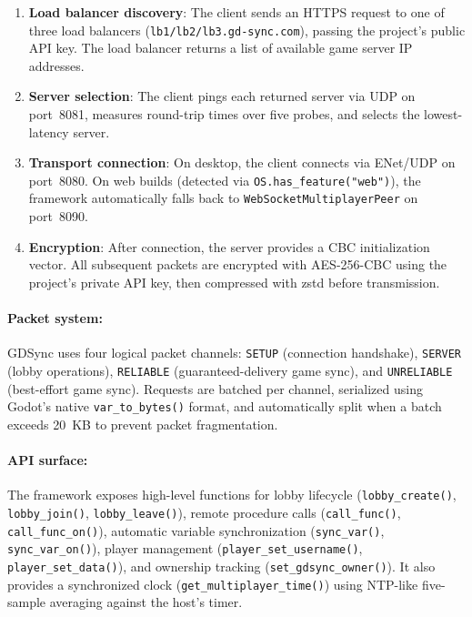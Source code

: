 \begin{enumerate}
    \item \textbf{Load balancer discovery}: The client sends an HTTPS request to one of three load balancers (\texttt{lb1/lb2/lb3.gd-sync.com}), passing the project's public API key. The load balancer returns a list of available game server IP addresses.
    \item \textbf{Server selection}: The client pings each returned server via UDP on port~8081, measures round-trip times over five probes, and selects the lowest-latency server.
    \item \textbf{Transport connection}: On desktop, the client connects via ENet/UDP on port~8080. On web builds (detected via \texttt{OS.has\_feature("web")}), the framework automatically falls back to \texttt{WebSocketMultiplayerPeer} on port~8090.
    \item \textbf{Encryption}: After connection, the server provides a CBC initialization vector. All subsequent packets are encrypted with AES-256-CBC using the project's private API key, then compressed with zstd before transmission.
\end{enumerate}

\paragraph*{Packet system:}
GDSync uses four logical packet channels: \texttt{SETUP} (connection handshake), \texttt{SERVER} (lobby operations), \texttt{RELIABLE} (guaranteed-delivery game sync), and \texttt{UNRELIABLE} (best-effort game sync). Requests are batched per channel, serialized using Godot's native \texttt{var\_to\_bytes()} format, and automatically split when a batch exceeds 20~KB to prevent packet fragmentation.

\paragraph*{API surface:}
The framework exposes high-level functions for lobby lifecycle (\texttt{lobby\_create()}, \texttt{lobby\_join()}, \texttt{lobby\_leave()}), remote procedure calls (\texttt{call\_func()}, \texttt{call\_func\_on()}), automatic variable synchronization (\texttt{sync\_var()}, \texttt{sync\_var\_on()}), player management (\texttt{player\_set\_username()}, \texttt{player\_set\_data()}), and ownership tracking (\texttt{set\_gdsync\_owner()}). It also provides a synchronized clock (\texttt{get\_multiplayer\_time()}) using NTP-like five-sample averaging against the host's timer.

